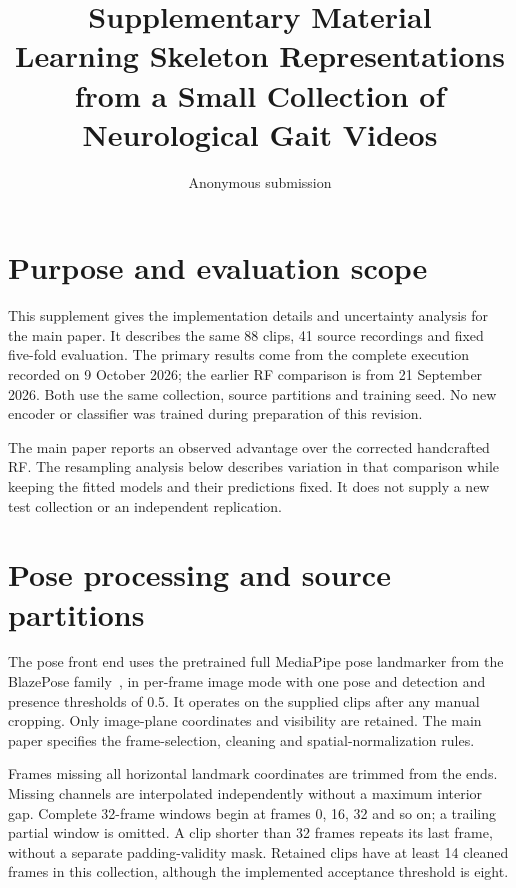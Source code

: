 \documentclass[10pt,twocolumn,letterpaper]{article}
\title{Supplementary Material\\Learning Skeleton Representations\\from a Small Collection of Neurological Gait Videos}
\author{Anonymous submission}
\begin{document}
\maketitle
\setcounter{section}{0}
\renewcommand{\thesection}{S\arabic{section}}
\renewcommand{\thetable}{S\arabic{table}}
\renewcommand{\thefigure}{S\arabic{figure}}
\renewcommand{\theequation}{S\arabic{equation}}

\section{Purpose and evaluation scope}
This supplement gives the implementation details and uncertainty analysis for the main paper. It describes the same 88 clips, 41 source recordings and fixed five-fold evaluation. The primary results come from the complete execution recorded on 9 October 2026; the earlier RF comparison is from 21 September 2026. Both use the same collection, source partitions and training seed. No new encoder or classifier was trained during preparation of this revision.

The main paper reports an observed advantage over the corrected handcrafted RF. The resampling analysis below describes variation in that comparison while keeping the fitted models and their predictions fixed. It does not supply a new test collection or an independent replication.

\section{Pose processing and source partitions}
The pose front end uses the pretrained full MediaPipe pose landmarker from the BlazePose family~\cite{blazepose}, in per-frame image mode with one pose and detection and presence thresholds of 0.5. It operates on the supplied clips after any manual cropping. Only image-plane coordinates and visibility are retained. The main paper specifies the frame-selection, cleaning and spatial-normalization rules.

Frames missing all horizontal landmark coordinates are trimmed from the ends. Missing channels are interpolated independently without a maximum interior gap. Complete 32-frame windows begin at frames 0, 16, 32 and so on; a trailing partial window is omitted. A clip shorter than 32 frames repeats its last frame, without a separate padding-validity mask. Retained clips have at least 14 cleaned frames in this collection, although the implemented acceptance threshold is eight.
\end{document}
